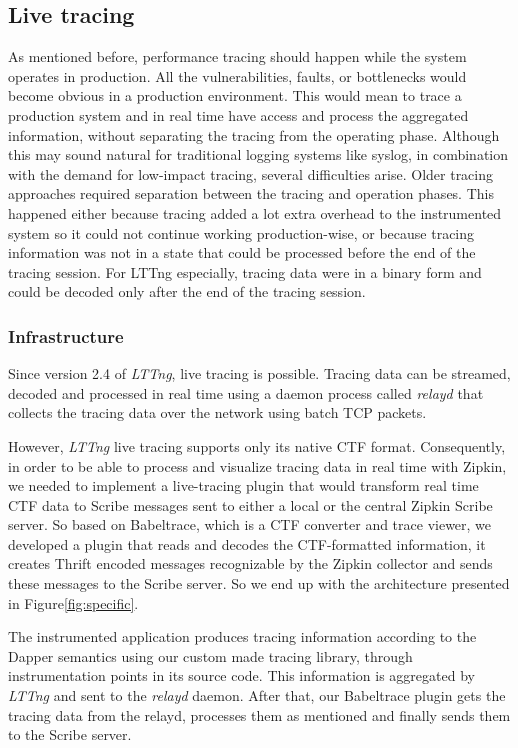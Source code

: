 \documentclass[a4paper,10pt,twocolumn]{article}
\begin{document}
\subsection{Live tracing} 
As mentioned before, performance tracing should happen while the system operates
in production. All the vulnerabilities, faults, or bottlenecks would become
obvious in a production environment. This would mean to trace a production
system and in real time have access and process the aggregated information,
without separating the tracing from the operating phase. Although this may sound
natural for traditional logging systems like syslog, in combination with the
demand for low-impact tracing, several difficulties arise. Older tracing
approaches required separation between the tracing and operation phases. This
happened either because tracing added a lot extra overhead to the instrumented
system so it could not continue working production-wise, or because tracing
information was not in a state that could be processed before the end of the
tracing session. For LTTng especially, tracing data were in a binary form and
could be decoded only after the end of the tracing session. 

\subsubsection{Infrastructure} Since version 2.4 of \emph{LTTng}, live tracing
is possible. Tracing data can be streamed, decoded and processed in real time
using a daemon process called \emph{relayd} that collects the tracing data over
the network using batch TCP packets.  

However, \emph{LTTng} live tracing supports only its native CTF format.
Consequently, in order to be able to process and visualize tracing data in real
time with Zipkin, we needed to implement a live-tracing plugin that would
transform real time CTF data to Scribe messages sent to either a local or the
central Zipkin Scribe server. So based on Babeltrace\cite{bltrace}, which is a
CTF converter and trace viewer, we developed a plugin that reads and decodes the
CTF-formatted information, it creates Thrift\cite{thrift} encoded messages
recognizable by the Zipkin collector and sends these messages to the Scribe
server. So we end up with the architecture presented in
Figure\ref{fig:specific}.

The instrumented application produces tracing information according to the
Dapper semantics using our custom made tracing library, through instrumentation
points in its source code. This information is aggregated by \emph{LTTng} and
sent to the \emph{relayd} daemon. After that, our Babeltrace plugin gets the
tracing data from the relayd, processes them as mentioned and finally sends them
to the Scribe server. 
\end{document}
